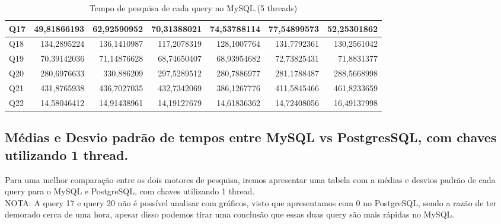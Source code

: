 \documentclass{article}
\begin{document}
\begin{table}[H]
{\begin{tabular}{|l|r|r|r|r|r|r|}
        Q17	&49,81866193&	62,92590952	&70,31388021	&74,53788114&	77,54899573&	52,25301862\\ \hline
        Q18	&134,2895224&	136,1410987	&117,2078319	&128,1007764&	131,7792361	&130,2561042\\ \hline
        Q19	&70,39142036&	71,14876628	&68,74650407	&68,93954682&	72,73825431	&71,8831377\\ \hline
        Q20	&280,6976633&	330,886209&	297,5289512	&280,7886977&	281,1788487&	288,5668998\\ \hline
        Q21	&431,8765938&	436,7027035	&432,7342069&	386,1267776&	411,5845466	&461,8233659\\ \hline
        Q22	&14,58046412&	14,91438961	&14,19127679	&14,61836362&	14,72408056	&16,49137998 \\ \hline
 \end{tabular}}
    \caption{Tempo de pesquisa de cada query no MySQL.(5 threads)}
    \label{tab:BC_Table6}
  \end{table}

\subsection{Médias e Desvio padrão de tempos entre MySQL vs PostgresSQL, com chaves utilizando 1 thread.}

\texttt{}\par Para uma melhor comparação entre os dois motores de pesquisa, iremos apresentar uma tabela com a médias e desvios padrão de cada query para o MySQL e PostgreSQL, com chaves utilizando 1 thread. \\
NOTA: A query 17 e query 20 não é possível analisar com gráficos, visto que apresentamos com 0 no PostgreSQL, sendo a razão de ter demorado cerca de uma hora, apesar disso podemos tirar uma conclusão que essas duas query são mais rápidas no MySQL.
\end{document}
